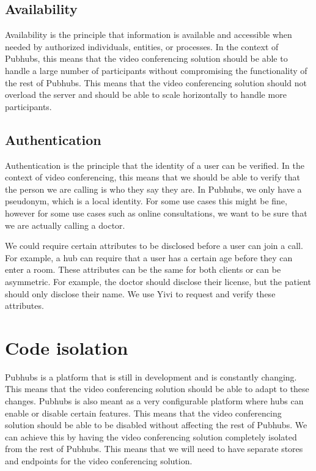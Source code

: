 \documentclass{report}
\begin{document}
\subsection{Availability}
Availability is the principle that information is available and accessible when needed by authorized individuals,
entities, or processes. In the context of Pubhubs, this means that the video conferencing solution should be able to
handle a large number of participants without compromising the functionality of the rest of Pubhubs. This means that
the video conferencing solution should not overload the server and should be able to scale horizontally to handle
more participants.

\subsection{Authentication}
Authentication is the principle that the identity of a user can be verified. In the context of video conferencing,
this means that we should be able to verify that the person we are calling is who they say they are. In Pubhubs, we
only have a pseudonym, which is a local identity. For some use cases this might be fine, however for some use cases
such as online consultations, we want to be sure that we are actually calling a doctor.

We could require certain attributes to be disclosed before a user can join a call. For example, a hub
can require that a user has a certain age before they can enter a room. These attributes can be the same for both
clients or can be asymmetric. For example, the doctor should disclose their license, but the patient should only
disclose their name. We use Yivi to request and verify these attributes.

\section{Code isolation}
Pubhubs is a platform that is still in development and is constantly changing. This means that the video
conferencing solution should be able to adapt to these changes. Pubhubs is also meant as a very configurable platform
where hubs can enable or disable certain features. This means that the video conferencing solution should be able to
be disabled without affecting the rest of Pubhubs. We can achieve this by having the video conferencing solution
completely isolated from the rest of Pubhubs. This means that we will need to have separate stores and endpoints for
the video conferencing solution.
\end{document}
